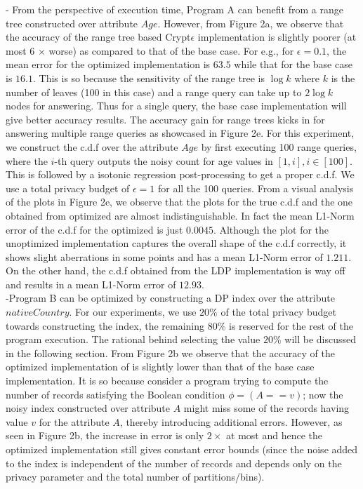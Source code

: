 - From the perspective of execution time, Program A can benefit from a range tree constructed over attribute $Age$.  However, from Figure 2a, we observe that the accuracy of the range tree based Crypt$\epsilon$ implementation is slightly poorer (at most 6 $\times$ worse)  as compared to that of the base case. For e.g., for $\epsilon=0.1$, the mean error for the optimized implementation is $63.5$ while that for the base case is $16.1$. This is so because the sensitivity of the range tree is $\log k$ where $k$ is the number of leaves (100 in this case) and a range query can take up to $2 \log k$ nodes for answering. Thus for a single query, the base case implementation will give better accuracy results. The accuracy gain for range trees kicks in for answering multiple range queries as showcased in Figure 2e.  For this experiment, we construct the c.d.f over the attribute $Age$ by first executing 100 range queries, where the $i$-th query outputs the noisy count for age values in $[1,i], i \in [100]$. This is followed by a isotonic regression post-processing to get a proper c.d.f. We use a total privacy budget of $\epsilon=1$ for all the 100 queries. From a visual analysis of the plots in Figure 2e, we observe that the plots for the true c.d.f and the one obtained from optimized \system are almost indistinguishable. In fact the mean L1-Norm error of the c.d.f for the optimized \system is just $0.0045$. Although the plot for the unoptimized implementation \system captures the overall shape of the c.d.f correctly, it shows slight aberrations in some points and has a mean L1-Norm error of $1.211$. On the other hand, the c.d.f obtained from the \textsf{LDP} implementation is way off and results in a mean L1-Norm error of $12.93$.  \\
-Program B can be optimized by constructing a DP index over the attribute $nativeCountry$. For our experiments, we use $20\%$ of the total privacy budget towards constructing the index, the remaining $80\%$ is reserved for the rest of the program execution. The rational behind selecting the value $20\%$ will be discussed in the following section. From Figure 2b we observe that the accuracy of the optimized implementation of \system is slightly lower than that of the base case implementation. It is so because consider a program trying to compute the number of records satisfying the Boolean condition $\phi= (A==v)$; now the noisy index constructed over attribute $A$ might miss some of the records having value $v$ for the attribute $A$, thereby introducing additional errors. 
However, as seen in Figure 2b, the increase in error is only $2\times$ at most and hence the optimized implementation still gives constant error bounds (since the noise added to the index is independent of the number of records and depends only on the privacy parameter and the total number of partitions/bins).

